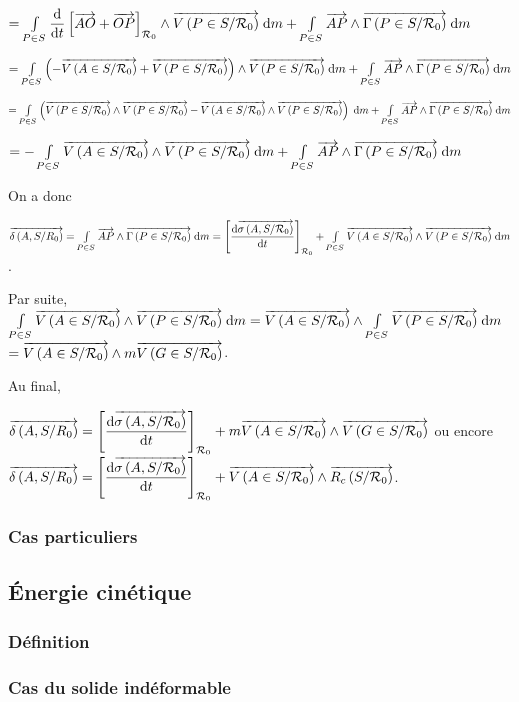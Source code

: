 \documentclass[10pt,fleqn]{article} %
\begin{document}
$=\int\limits_{P\in S} \dfrac{\dd }{\dd t}\left[ \vect{AO}+\vect{OP} \right]_{\rep{0}}\wedge \vectv{P}{S}{\rep{0}}\; \dd m 
+ \int\limits_{P\in S}  \vect{AP}\wedge \vectg{P}{S}{\rep{0}} \; \dd m$

$=\int\limits_{P\in S} \left(-\vectv{A}{S}{\rep{0}} + \vectv{P}{S}{\rep{0}}\right)\wedge \vectv{P}{S}{\rep{0}}\; \dd m 
+ \int\limits_{P\in S}  \vect{AP}\wedge \vectg{P}{S}{\rep{0}} \; \dd m$

$=\int\limits_{P\in S} \left(\vectv{P}{S}{\rep{0}} \wedge \vectv{P}{S}{\rep{0}}-\vectv{A}{S}{\rep{0}}\wedge \vectv{P}{S}{\rep{0}}  \right)\; \dd m 
+ \int\limits_{P\in S}  \vect{AP}\wedge \vectg{P}{S}{\rep{0}} \; \dd m$

$=-\int\limits_{P\in S} \vectv{A}{S}{\rep{0}}\wedge \vectv{P}{S}{\rep{0}} \; \dd m 
+ \int\limits_{P\in S}  \vect{AP}\wedge \vectg{P}{S}{\rep{0}} \; \dd m$

On a donc 

$ \vectmd{A}{S}{R_0}= \int\limits_{P\in S}  \vect{AP}\wedge \vectg{P}{S}{\rep{0}} \; \dd m = 
\left[ \dfrac{\dd \vectmc{A}{S}{\rep{0}}}{\dd t} \right]_{\rep{0}} + \int\limits_{P\in S} \vectv{A}{S}{\rep{0}}\wedge \vectv{P}{S}{\rep{0}} \; \dd m $.

Par suite, $\int\limits_{P\in S} \vectv{A}{S}{\rep{0}}\wedge \vectv{P}{S}{\rep{0}} \; \dd m =\vectv{A}{S}{\rep{0}}\wedge \int\limits_{P\in S}  \vectv{P}{S}{\rep{0}} \; \dd m  $
$=\vectv{A}{S}{\rep{0}}\wedge m \vectv{G}{S}{\rep{0}} $.

Au final, 

$ \vectmd{A}{S}{R_0}= \left[ \dfrac{\dd \vectmc{A}{S}{\rep{0}}}{\dd t} \right]_{\rep{0}} +m \vectv{A}{S}{\rep{0}}\wedge  \vectv{G}{S}{\rep{0}} $ ou encore 
$ \vectmd{A}{S}{R_0}= \left[ \dfrac{\dd \vectmc{A}{S}{\rep{0}}}{\dd t} \right]_{\rep{0}} + \vectv{A}{S}{\rep{0}}\wedge  \vectrc{S}{\rep{0}} $.

\subsubsection{Cas particuliers}

\subsection{Énergie cinétique}
\subsubsection{Définition}
\subsubsection{Cas du solide indéformable}
\end{document}
